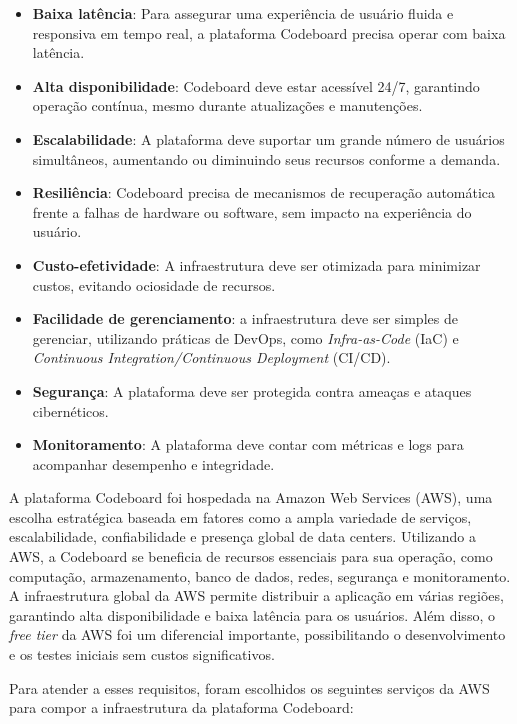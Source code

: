 \begin{itemize}
    \item \textbf{Baixa latência}: Para assegurar uma experiência de usuário fluida e responsiva em tempo real, a plataforma Codeboard precisa operar com baixa latência.
    \item \textbf{Alta disponibilidade}: Codeboard deve estar acessível 24/7, garantindo operação contínua, mesmo durante atualizações e manutenções.
    \item \textbf{Escalabilidade}: A plataforma deve suportar um grande número de usuários simultâneos, aumentando ou diminuindo seus recursos conforme a demanda.
    \item \textbf{Resiliência}: Codeboard precisa de mecanismos de recuperação automática frente a falhas de hardware ou software, sem impacto na experiência do usuário.
    \item \textbf{Custo-efetividade}: A infraestrutura deve ser otimizada para minimizar custos, evitando ociosidade de recursos.
    \item \textbf{Facilidade de gerenciamento}: a infraestrutura deve ser simples de gerenciar, utilizando práticas de DevOps, como \emph{Infra-as-Code} (IaC) e \emph{Continuous Integration/Continuous Deployment} (CI/CD). %
    \item \textbf{Segurança}: A plataforma deve ser protegida contra ameaças e ataques cibernéticos.
    \item \textbf{Monitoramento}: A plataforma deve contar com métricas e logs para acompanhar desempenho e integridade.
\end{itemize}

A plataforma Codeboard foi hospedada na Amazon Web Services (AWS), uma escolha estratégica baseada em fatores como a ampla variedade de serviços, escalabilidade, confiabilidade e presença global de data centers. Utilizando a AWS, a Codeboard se beneficia de recursos essenciais para sua operação, como computação, armazenamento, banco de dados, redes, segurança e monitoramento. A infraestrutura global da AWS permite distribuir a aplicação em várias regiões, garantindo alta disponibilidade e baixa latência para os usuários. Além disso, o \emph{free tier} da AWS foi um diferencial importante, possibilitando o desenvolvimento e os testes iniciais sem custos significativos.

Para atender a esses requisitos, foram escolhidos os seguintes serviços da AWS para compor a infraestrutura da plataforma Codeboard:

